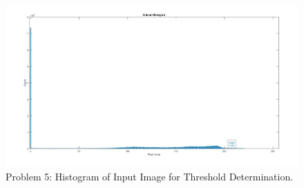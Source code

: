 \documentclass[./rarnold_project_89.tex]{subfiles}
\begin{document}
	\clearpage
	
	\begin{figure}[!htbp]
	\centering
	\includegraphics[scale=0.38]{"problem5_hist"}
	\captionsetup{justification=centering}
	\caption{Problem 5: Histogram of Input Image for Threshold Determination.} 
	\label{p5hist}
	\end{figure}
	
	\clearpage
		
\end{document}
